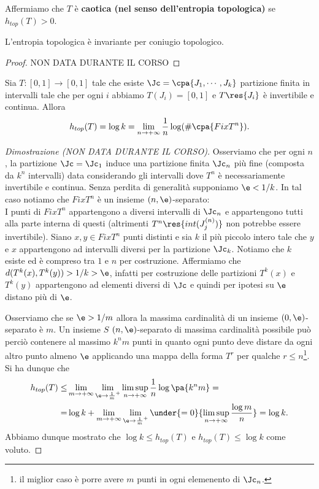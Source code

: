 \begin{definition}
Affermiamo che $T$ \`e \textbf{caotica (nel senso dell'entropia topologica)} se $h_{top}(T)>0$.
\end{definition}

\begin{proposition}\label{EntropiaTopologicaInvariantePerConiugioTopologico}
L'entropia topologica \`e invariante per coniugio topologico.
\end{proposition}
\begin{proof}
NON DATA DURANTE IL CORSO
\end{proof}

\begin{proposition}\label{EntropiaTopologicaEPartizioni}
Sia $T:[0,1]\to[0,1]$ tale che esiste $\Jc=\cpa{J_1,\cdots, J_k}$ partizione finita in intervalli tale che per ogni $i$ abbiamo $T(J_i)=[0,1]$ e $T\res{J_i}$ \`e invertibile e continua. Allora 
\[h_{top}(T)=\log k=\lim_{n\to+\infty}\frac1n\log(\#\cpa{Fix T^n}).\]
\end{proposition}
\begin{proof}[Dimostrazione (NON DATA DURANTE IL CORSO)]
Osserviamo che per ogni $n$, la partizione $\Jc=\Jc_1$ induce una partizione finita $\Jc_n$ pi\`u fine (composta da $k^n$ intervalli) data considerando gli intervalli dove $T^n$ \`e necessariamente invertibile e continua.
Senza perdita di generalit\`a supponiamo $\e<1/k$. In tal caso notiamo che $Fix T^n$ \`e un insieme $(n,\e)$-separato:\\
I punti di $Fix T^n$ appartengono a diversi intervalli di $\Jc_n$ e appartengono tutti alla parte interna di questi (altrimenti $T^n\res{int(J^{(n)}_j)}$ non potrebbe essere invertibile). Siano $x,y\in Fix T^n$ punti distinti e sia $k$ il pi\`u piccolo intero tale che $y$ e $x$ appartengono ad intervalli diversi per la partizione $\Jc_k$. Notiamo che $k$ esiste ed \`e compreso tra $1$ e $n$ per costruzione. Affermiamo che $d(T^k(x),T^k(y))>1/k>\e$, infatti per costruzione delle partizioni $T^k(x)$ e $T^k(y)$ appartengono ad elementi diversi di $\Jc$ e quindi per ipotesi su $\e$ distano pi\`u di $\e$.

Osserviamo che se $\e>1/m$ allora la massima cardinalit\`a di un insieme $(0,\e)$-separato \`e $m$. Un insieme $S$ $(n,\e)$-separato di massima cardinalit\`a possibile pu\`o perci\`o contenere al massimo $k^nm$ punti in quanto ogni punto deve distare da ogni altro punto almeno $\e$ applicando una mappa della forma $T^r$ per qualche $r\leq n$\footnote{il miglior caso \`e porre avere $m$ punti in ogni elemenento di $\Jc_n$.}. Si ha dunque che 
\begin{align*}
h_{top}(T)\leq&\lim_{m\to+\infty}\lim_{\e\to\frac1m^+}\limsup_{n\to+\infty}\frac1n\log\pa{k^nm}=\\
=&\log k +\lim_{m\to+\infty}\lim_{\e\to\frac1m^+}\under{=0}{\limsup_{n\to+\infty}\frac{\log m}n}=\log k.
\end{align*}
Abbiamo dunque mostrato che $\log k\leq h_{top}(T)$ e $h_{top}(T)\leq \log k$ come voluto.
\end{proof}

